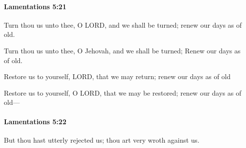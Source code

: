 		\paragraph{Lamentations 5:21} %
			\label{LAMENTATIONS-5-21}

			Turn thou us unto thee, O LORD, and we shall be turned; renew our days as of old.

			\begin{versebox}
					\item[BHS] 
					\item[LXX] 
					\item[ASV] Turn thou us unto thee, O Jehovah, and we shall be turned; Renew our days as of old.
					\item[NIV] Restore us to yourself, LORD, that we may return; renew our days as of old
					\item[NRSV] Restore us to yourself, O LORD, that we may be restored; renew our days as of old—
			\end{versebox}

		\paragraph{Lamentations 5:22} %
			\label{LAMENTATIONS-5-22}

			But thou hast utterly rejected us; thou art very wroth against us.

